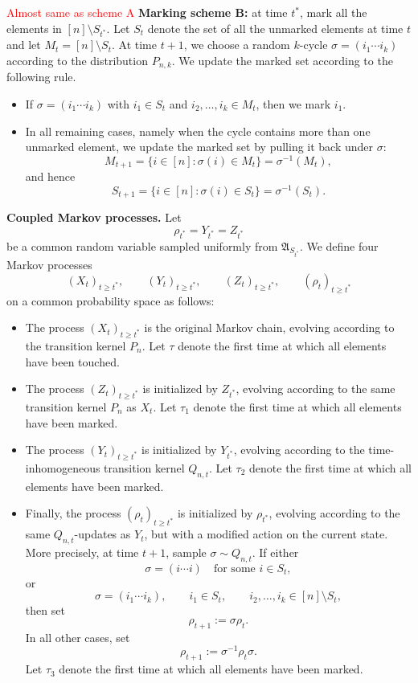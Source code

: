 \textcolor{red}{Almost same as scheme A}
\noindent\textbf{Marking scheme B:} at time $t^*$, mark all the elements in $[n] \setminus S_{t^*}$. Let $S_t$ denote the set of all the unmarked elements at time $t$ and let $M_t = [n] \setminus S_t$. At time $t + 1$, we choose a random $k$-cycle $\sigma = (i_1 \cdots i_k)$ according to the distribution $P_{n,k}$. We update the marked set according to the following rule.
\begin{itemize}
    \item If $\sigma=(i_1\cdots i_k)$ with $i_1\in S_t$ and
$i_2,\ldots,i_k\in M_t$, then we mark $i_1$.
\item In all remaining cases, namely when the cycle contains more than one unmarked element, we update the marked set by pulling it back under $\sigma$:
\[
    M_{t+1}
    =
    \{i\in[n]:\sigma(i)\in M_t\}
    =
    \sigma^{-1}(M_t),
\]
and hence
\[
    S_{t+1}
    =
    \{i\in[n]:\sigma(i)\in S_t\}
    =
    \sigma^{-1}(S_t).
\]
\end{itemize}

\noindent\textbf{Coupled Markov processes.}
Let
\[
    \rho_{t^*}=Y_{t^*}=Z_{t^*}
\]
be a common random variable sampled uniformly from \(\mathfrak A_{S_{t^*}}\). We define four Markov processes
\[
    (X_t)_{t\geq t^*},\qquad
    (Y_t)_{t\geq t^*},\qquad
    (Z_t)_{t\geq t^*},\qquad
    (\rho_t)_{t\geq t^*}
\]
on a common probability space as follows:

\begin{itemize}
    \item The process $(X_t)_{t\geq t^*}$ is the original Markov chain, evolving according to the transition kernel \(P_n\). Let \(\tau\) denote the first time at which all elements have been touched.
    \item The process $(Z_t)_{t\geq t^*}$ is initialized by $Z_{t^*}$, evolving according to the same transition kernel \(P_n\) as $X_t$. Let \(\tau_1\) denote the first time at which all elements have been marked.
    \item The process $(Y_t)_{t\geq t^*}$ is initialized by $Y_{t^*}$, evolving according to the time-inhomogeneous transition kernel \(Q_{n,t}\). Let \(\tau_2\) denote the first time at which all elements have been marked.
    \item Finally, the process $(\rho_t)_{t\geq t^*}$ is initialized by $\rho_{t^*}$, evolving according to the same \(Q_{n,t}\)-updates as $Y_t$, but with a modified action on the current state. More precisely, at time \(t+1\), sample \(\sigma\sim Q_{n,t}\). If either
\[
    \sigma=(i\cdots i)\quad \text{for some } i\in S_t,
\]
or
\[
    \sigma=(i_1\cdots i_k),\qquad i_1\in S_t,\qquad
    i_2,\ldots,i_k\in [n]\setminus S_t,
\]
then set
\[
    \rho_{t+1}:=\sigma\rho_t.
\]
In all other cases, set
\[
    \rho_{t+1}:=\sigma^{-1}\rho_t\sigma.
\]
Let \(\tau_3\) denote the first time at which all elements have been marked.
\end{itemize}

